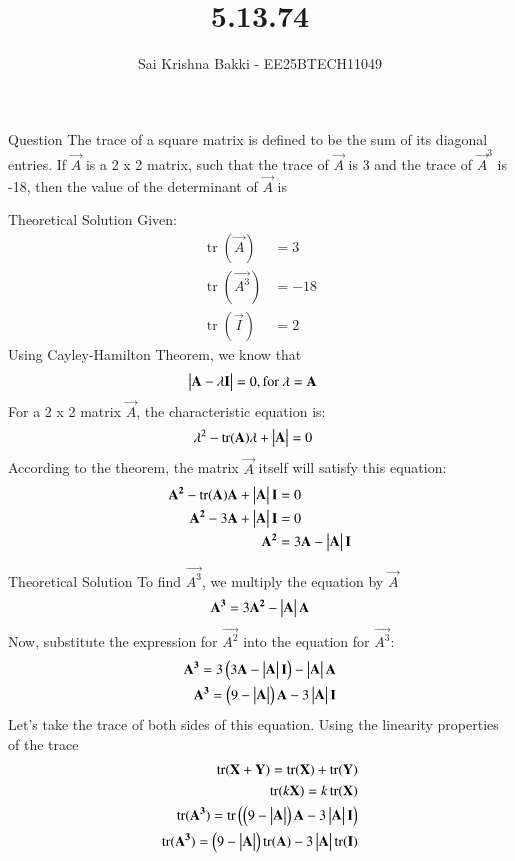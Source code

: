 \documentclass{beamer}
\title %
{5.13.74}
\date{}
\author %
{Sai Krishna Bakki - EE25BTECH11049}
\begin{document}
\frame{\titlepage}
\begin{frame}{Question}
The trace of a square matrix is defined to be the sum of its diagonal entries. If $\vec{A}$ is a 2 x 2 matrix, such that the trace of $\vec{A}$ is 3 and the trace of $\vec{A}^{3}$ is -18, then the value of the determinant of $\vec{A}$ is
\end{frame}
\begin{frame}{Theoretical Solution}
    Given:
\begin{align}
    \operatorname{tr}(\vec{A})&=3\\
    \operatorname{tr}(\vec{A^3})&=-18\\
    \operatorname{tr}(\vec{I})&=2
\end{align}
Using Cayley-Hamilton Theorem, we know that
\begin{align}
    \begin{vmatrix}\mathbf{A}-\lambda\mathbf{I}\end{vmatrix}&=0,
    \text{for $\lambda=\mathbf{A}$}
\end{align}
For a 2 x 2 matrix $\vec{A}$, the characteristic equation is:
\begin{align}
    \lambda^{2}-\operatorname{tr}(\mathbf{A})\lambda+\begin{vmatrix}\mathbf{A}\end{vmatrix}&=0
\end{align}
According to the theorem, the matrix $\vec{A}$ itself will satisfy this equation:
\begin{align}
    \mathbf{A^2}-\operatorname{tr}(\mathbf{A})\mathbf{A}+\begin{vmatrix}\mathbf{A}\end{vmatrix}\mathbf{I}&=0\\
        \mathbf{A^2}-3\mathbf{A}+\begin{vmatrix}\mathbf{A}\end{vmatrix}\mathbf{I}&=0\\
        \mathbf{A^2}&=3\mathbf{A}-\begin{vmatrix}\mathbf{A}\end{vmatrix}\mathbf{I}
\end{align}
\end{frame}
\begin{frame}{Theoretical Solution}
To find $\vec{A^3}$, we multiply the equation by $\vec{A}$
\begin{align}
    \mathbf{A^3}=3\mathbf{A^2}-\begin{vmatrix}\mathbf{A}\end{vmatrix}\mathbf{A}
\end{align}
Now, substitute the expression for $\vec{A^2}$ into the equation for $\vec{A^3}$:
\begin{align}
\mathbf{A^3}=3\left(3\mathbf{A}-\begin{vmatrix}\mathbf{A}\end{vmatrix}\mathbf{I}\right)-\begin{vmatrix}\mathbf{A}\end{vmatrix}\mathbf{A}\\
\mathbf{A^3}=\left(9-\begin{vmatrix}\mathbf{A}\end{vmatrix}\right)\mathbf{A}-3\begin{vmatrix}\mathbf{A}\end{vmatrix}\mathbf{I}
\end{align}
Let's take the trace of both sides of this equation. Using the linearity properties of the trace 
\begin{align}
    \operatorname{tr}(\mathbf{X}+\mathbf{Y})=\operatorname{tr}(\mathbf{X})+\operatorname{tr}(\mathbf{Y})\\
    \operatorname{tr}(k\mathbf{X})=k\operatorname{tr}(\mathbf{X})\\
    \operatorname{tr}(\mathbf{A^3})=\operatorname{tr}\left(\left(9-\begin{vmatrix}\mathbf{A}\end{vmatrix}\right)\mathbf{A}-3\begin{vmatrix}\mathbf{A}\end{vmatrix}\mathbf{I}\right)\\
    \operatorname{tr}(\mathbf{A^3})=\left(9-\begin{vmatrix}\mathbf{A}\end{vmatrix}\right)\operatorname{tr}(\mathbf{A})-3\begin{vmatrix}\mathbf{A}\end{vmatrix}\operatorname{tr}(\mathbf{I})
\end{align}
\end{frame}
\end{document}
